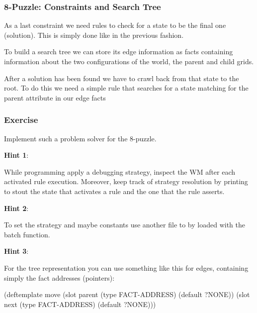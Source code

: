 \documentclass[xcolor={usenames,dvipsnames,svgnames}, compress]{beamer}
\begin{document}
\begin{frame}
  \frametitle{8-Puzzle: Constraints and Search Tree}
  As a last constraint we need rules to check for a state to be the
  final one (solution). This is simply done like in the previous
  fashion.\par\bigskip
  
  To build a search tree we can store its edge information as facts
  containing information about the two configurations of the
  world, the parent and child grids.\par\bigskip

  After a solution has been found we have to crawl back from that
  state to the root. To do this we need a simple rule that searches
  for a state matching for the parent attribute in our edge facts\par\bigskip

  

  
\end{frame}

\begin{frame}[fragile]
  \frametitle{Exercise}
  Implement such a problem solver for the 8-puzzle.\par\bigskip
  
  \textbf{Hint 1}:\par
  While programming apply a debugging strategy, inspect the WM after
  each activated rule execution. Moreover, keep track of strategy
  resolution by printing to stout the state that activates a rule and
  the one that the rule asserts.\par\bigskip
  
  \textbf{Hint 2}:\par
  To set the strategy and maybe constants use another file to by
  loaded with the \textsf{batch} function.\par\bigskip

  \textbf{Hint 3}:\par
  For the tree representation you can use something like this for
  edges, containing simply the fact addresses (pointers):
  \begin{clips-code}[numbers=none]
    (deftemplate move
        (slot parent (type FACT-ADDRESS) (default ?NONE))
        (slot next (type FACT-ADDRESS) (default ?NONE)))
  \end{clips-code}
      
\end{frame}
\end{document}
